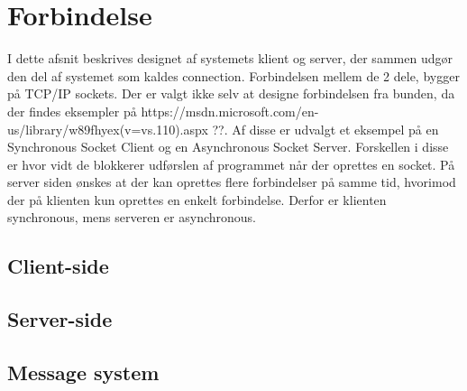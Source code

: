 \chapter{Forbindelse}
I dette afsnit beskrives designet af systemets klient og server, der sammen udgør den del af systemet som kaldes connection. Forbindelsen mellem de 2 dele, bygger på TCP/IP sockets. Der er valgt ikke selv at designe forbindelsen fra bunden, da der findes eksempler på https://msdn.microsoft.com/en-us/library/w89fhyex(v=vs.110).aspx ??. Af disse er udvalgt et eksempel på en Synchronous Socket Client og en Asynchronous Socket Server. Forskellen i disse er hvor vidt de blokkerer udførslen af programmet når der oprettes en socket. På server siden ønskes at der kan oprettes flere forbindelser på samme tid, hvorimod der på klienten kun oprettes en enkelt forbindelse. Derfor er klienten synchronous, mens serveren er asynchronous.
\section{Client-side}

\section{Server-side}

\section{Message system}

%
%